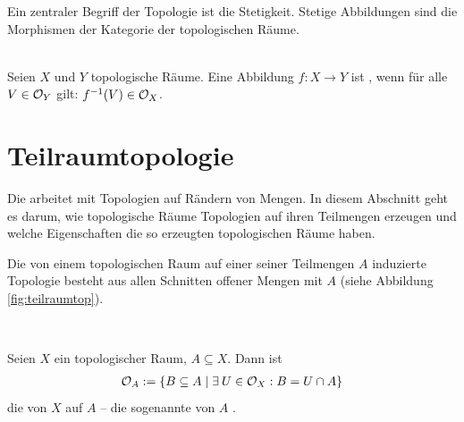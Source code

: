     Ein
    zentraler Begriff der Topologie ist die Stetigkeit.
    Stetige Abbildungen sind die Morphismen der Kategorie der topologischen Räume.
    \begin{dfn}[Stetigkeit]\label{def:stetig} \ \\%
        Seien $X$ und $Y$ topologische Räume.
        Eine Abbildung $f: X \to Y$ ist , wenn für alle $V \in \mathcal{O}_Y$ gilt: $f^{-1}(V) \in \mathcal{O}_X$.
    \end{dfn}

    
    
    
    
    
    
    
\section{Teilraumtopologie}\label{sec:teilraum-top}
    Die \strukt arbeitet mit Topologien auf Rändern von Mengen.
    In diesem Abschnitt geht es darum, wie topologische Räume Topologien auf ihren Teilmengen erzeugen und welche Eigenschaften die so erzeugten topologischen Räume haben. 
    

    Die
    von einem topologischen Raum auf einer seiner Teilmengen $A$ induzierte Topologie besteht aus allen Schnitten offener Mengen mit $A$ (siehe Abbildung \ref{fig:teilraumtop}).
    \begin{dfn}[Teilraumtopologie]\label{def:trTop} \ \vspace{8pt}

        \noindent
        Seien $X$ ein topologischer Raum, $A \subseteq X$.
        Dann ist 
        \begin{align*}
            \mathcal{O}_A := \{B \subseteq A \mid \exists\: U \in \mathcal{O}_X : B = U \cap A\}
        \end{align*}
        die von $X$ auf $A$  -- die sogenannte  von $A$ .
        
    \end{dfn}
    
